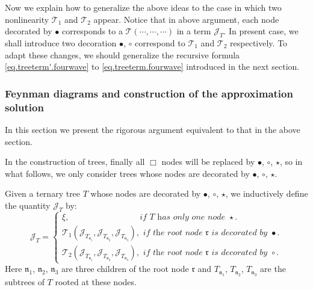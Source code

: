Now we explain how to generalize the above ideas to the case in which two nonlinearity $\mathcal{T}_1$ and $\mathcal{T}_2$ appear.
Notice that in above argument, each node decorated by $\bullet$ corresponds to a $\mathcal{T}(\cdots,\cdots,\cdots)$ in a term $\mathcal{J}_{T}$. In present case, we shall introduce two decoration $\bullet$, $\circ$ correspond to $\mathcal{T}_1$ and $\mathcal{T}_2$ respectively. 
To adapt these changes, we should generalize the recursive formula \eqref{eq.treeterm'.fourwave} to \eqref{eq.treeterm.fourwave} introduced in the next section.


\subsubsection{Feynman diagrams and construction of the approximation solution} In this section we present the rigorous argument equivalent to that in the above section. 

In the construction of trees, finally all $\Box$ nodes will be replaced by $\bullet$, $\circ$, $\star$, so in what follows, we only consider trees whose nodes are decorated by $\bullet$, $\circ$, $\star$.

\begin{defn}\label{def.treeterms.fourwave} Given a ternary tree $T$ whose nodes are decorated by $\bullet$, $\circ$, $\star$,
we inductively define the quantity $\mathcal{J}_T$ by:
\begin{equation}\label{eq.treeterm.fourwave}
 \mathcal{J}_T=
 \begin{cases}
 \xi, \qquad\qquad\qquad\qquad \textit{ if }T\textit{ has only one node }\star.
 \\
 \mathcal{T}_1(\mathcal{J}_{T_{\mathfrak{n}_1}}, \mathcal{J}_{T_{\mathfrak{n}_2}}, \mathcal{J}_{T_{\mathfrak{n}_3}}), \textit{ if the root node }\mathfrak{r}\textit{ is decorated by }\bullet.
 \\
 \mathcal{T}_2(\mathcal{J}_{T_{\mathfrak{n}_1}}, \mathcal{J}_{T_{\mathfrak{n}_2}}, \mathcal{J}_{T_{\mathfrak{n}_3}}), \textit{ if the root node }\mathfrak{r}\textit{ is decorated by }\circ.
 \end{cases}
\end{equation}
Here $\mathfrak{n}_1$, $\mathfrak{n}_2$, $\mathfrak{n}_3$ are three children of the root node $\mathfrak{r}$ and $T_{\mathfrak{n}_1}$, $T_{\mathfrak{n}_2}$, $T_{\mathfrak{n}_3}$ are the subtrees of $T$ rooted at these nodes.
\end{defn}

